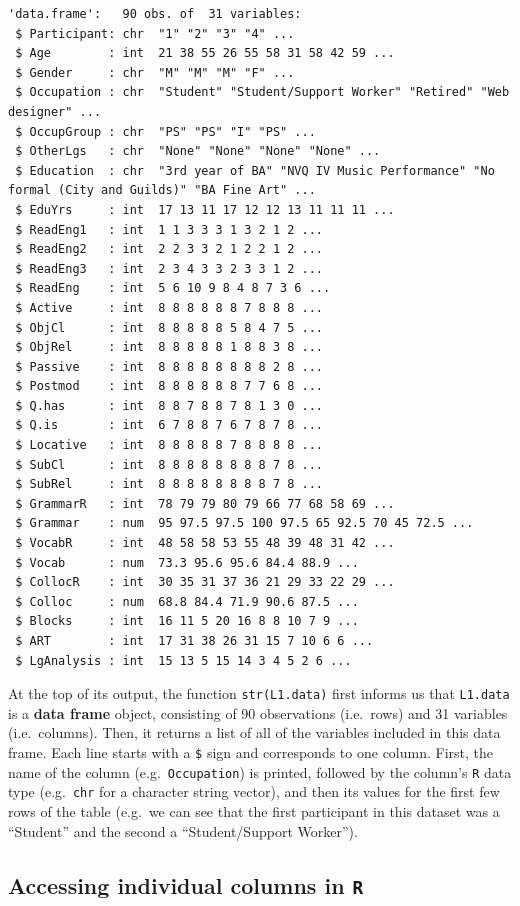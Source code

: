 \documentclass[
  letterpaper,
  DIV=11,
  numbers=noendperiod]{scrreprt}
\begin{document}
\begin{verbatim}
'data.frame':   90 obs. of  31 variables:
 $ Participant: chr  "1" "2" "3" "4" ...
 $ Age        : int  21 38 55 26 55 58 31 58 42 59 ...
 $ Gender     : chr  "M" "M" "M" "F" ...
 $ Occupation : chr  "Student" "Student/Support Worker" "Retired" "Web designer" ...
 $ OccupGroup : chr  "PS" "PS" "I" "PS" ...
 $ OtherLgs   : chr  "None" "None" "None" "None" ...
 $ Education  : chr  "3rd year of BA" "NVQ IV Music Performance" "No formal (City and Guilds)" "BA Fine Art" ...
 $ EduYrs     : int  17 13 11 17 12 12 13 11 11 11 ...
 $ ReadEng1   : int  1 1 3 3 3 1 3 2 1 2 ...
 $ ReadEng2   : int  2 2 3 3 2 1 2 2 1 2 ...
 $ ReadEng3   : int  2 3 4 3 3 2 3 3 1 2 ...
 $ ReadEng    : int  5 6 10 9 8 4 8 7 3 6 ...
 $ Active     : int  8 8 8 8 8 8 7 8 8 8 ...
 $ ObjCl      : int  8 8 8 8 8 5 8 4 7 5 ...
 $ ObjRel     : int  8 8 8 8 8 1 8 8 3 8 ...
 $ Passive    : int  8 8 8 8 8 8 8 8 2 8 ...
 $ Postmod    : int  8 8 8 8 8 8 7 7 6 8 ...
 $ Q.has      : int  8 8 7 8 8 7 8 1 3 0 ...
 $ Q.is       : int  6 7 8 8 7 6 7 8 7 8 ...
 $ Locative   : int  8 8 8 8 8 7 8 8 8 8 ...
 $ SubCl      : int  8 8 8 8 8 8 8 8 7 8 ...
 $ SubRel     : int  8 8 8 8 8 8 8 8 7 8 ...
 $ GrammarR   : int  78 79 79 80 79 66 77 68 58 69 ...
 $ Grammar    : num  95 97.5 97.5 100 97.5 65 92.5 70 45 72.5 ...
 $ VocabR     : int  48 58 58 53 55 48 39 48 31 42 ...
 $ Vocab      : num  73.3 95.6 95.6 84.4 88.9 ...
 $ CollocR    : int  30 35 31 37 36 21 29 33 22 29 ...
 $ Colloc     : num  68.8 84.4 71.9 90.6 87.5 ...
 $ Blocks     : int  16 11 5 20 16 8 8 10 7 9 ...
 $ ART        : int  17 31 38 26 31 15 7 10 6 6 ...
 $ LgAnalysis : int  15 13 5 15 14 3 4 5 2 6 ...
\end{verbatim}

At the top of its output, the function \texttt{str(L1.data)} first
informs us that \texttt{L1.data} is a \textbf{data frame} object,
consisting of 90 observations (i.e.~rows) and 31 variables
(i.e.~columns). Then, it returns a list of all of the variables included
in this data frame. Each line starts with a \texttt{\$} sign and
corresponds to one column. First, the name of the column
(e.g.~\texttt{Occupation}) is printed, followed by the column's
\texttt{R} data type (e.g.~\texttt{chr} for a character string vector),
and then its values for the first few rows of the table (e.g.~we can see
that the first participant in this dataset was a ``Student'' and the
second a ``Student/Support Worker'').

\subsection{\texorpdfstring{Accessing individual columns in
\texttt{R}}{Accessing individual columns in R}}\label{sec-DollarSign}
\end{document}
